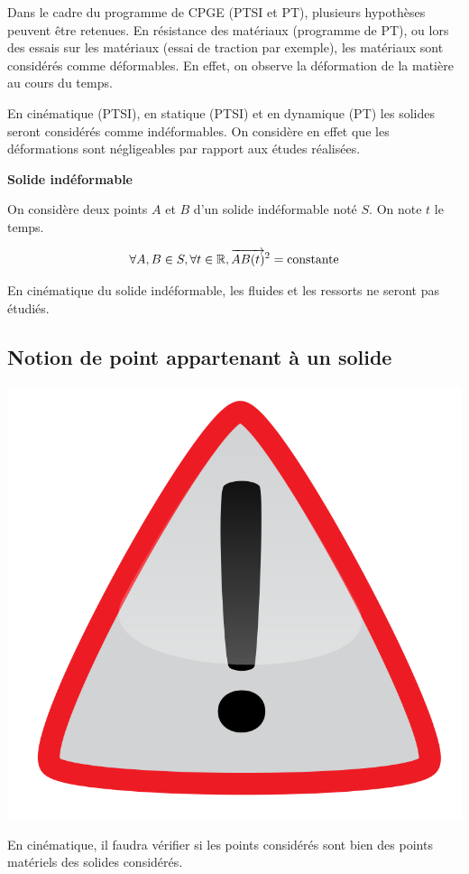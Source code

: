 \documentclass[10pt,oneside]{article}
\begin{document}
Dans le cadre du programme de CPGE (PTSI et PT), plusieurs hypothèses peuvent être retenues.
En résistance des matériaux (programme de PT), ou lors des essais sur les matériaux (essai de traction par exemple), les matériaux sont considérés comme déformables. En effet, on observe la déformation de la matière au cours du temps.

En cinématique (PTSI), en statique (PTSI) et en dynamique (PT) les solides seront considérés comme indéformables. On considère en effet que les déformations sont négligeables par rapport aux études réalisées.

\begin{hypo}
\textbf{Solide indéformable}

On considère deux points $A$ et $B$ d'un solide indéformable noté $S$. On note $t$ le temps.

$$
\forall A,B \in S, \forall t\in \mathbb{R}, \overrightarrow{AB(t)}^2 = \text{constante}
$$

\end{hypo}
\begin{rem}
En cinématique du solide indéformable, les fluides et les ressorts ne seront pas étudiés.
\end{rem}


\subsection{Notion de point appartenant à un solide}



\begin{warn}
\begin{minipage}[c]{.15\linewidth}
\begin{center}
\includegraphics[width=.8\textwidth]{png/warning3}
\end{center}
\end{minipage} \hfill
\begin{minipage}[c]{.8\linewidth}
En cinématique, il faudra vérifier si les points considérés sont bien des points matériels des solides considérés. 
\end{minipage}
\end{warn}
\end{document}
